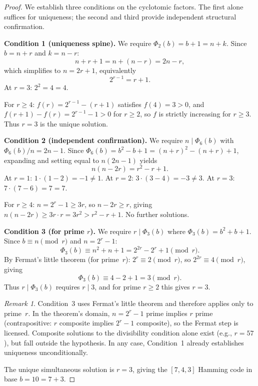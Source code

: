 \documentclass[11pt]{article}
\theoremstyle{definition}
\theoremstyle{remark}
\newtheorem{remark}{Remark}
\begin{document}
\begin{proof}
We establish three conditions on the cyclotomic factors. The first
alone suffices for uniqueness; the second and third provide
independent structural confirmation.

\medskip
\noindent\textbf{Condition 1 (uniqueness spine).}
We require $\Phi_2(b) = b+1 = n+k$. Since $b=n+r$ and $k=n-r$:
\[
n+r+1 = n + (n-r) = 2n-r,
\]
which simplifies to $n = 2r+1$, equivalently
\begin{equation}\label{eq:cond1}
2^{r-1} = r+1.
\end{equation}
At $r=3$: $2^2 = 4 = 4$. \checkmark

For $r \geq 4$: $f(r) = 2^{r-1}-(r+1)$ satisfies $f(4)=3>0$, and
$f(r+1)-f(r) = 2^{r-1}-1 > 0$ for $r \geq 2$, so $f$ is strictly
increasing for $r \geq 3$. Thus $r=3$ is the unique solution.

\medskip
\noindent\textbf{Condition 2 (independent confirmation).}
We require $n \mid \Phi_6(b)$ with $\Phi_6(b)/n = 2n-1$.
Since $\Phi_6(b) = b^2-b+1 = (n+r)^2-(n+r)+1$, expanding and
setting equal to $n(2n-1)$ yields
\begin{equation}\label{eq:cond2}
n(n-2r) = r^2-r+1.
\end{equation}
At $r=1$: $1 \cdot (1-2) = -1 \neq 1$. At $r=2$: $3 \cdot (3-4) = -3 \neq 3$.
At $r=3$: $7 \cdot (7-6) = 7 = 7$. \checkmark

For $r \geq 4$: $n = 2^r-1 \geq 3r$, so $n-2r \geq r$, giving
$n(n-2r) \geq 3r \cdot r = 3r^2 > r^2-r+1$. No further solutions.

\medskip
\noindent\textbf{Condition 3 (for prime $r$).}
We require $r \mid \Phi_3(b)$ where $\Phi_3(b) = b^2+b+1$.
Since $b \equiv n \pmod{r}$ and $n = 2^r-1$:
\[
\Phi_3(b) \equiv n^2+n+1 = 2^{2r}-2^r+1 \pmod{r}.
\]
By Fermat's little theorem (for prime~$r$): $2^r \equiv 2 \pmod{r}$,
so $2^{2r} \equiv 4 \pmod{r}$, giving
\[
\Phi_3(b) \equiv 4-2+1 = 3 \pmod{r}.
\]
Thus $r \mid \Phi_3(b)$ requires $r \mid 3$, and for prime $r \geq 2$
this gives $r=3$.

\begin{remark}
Condition~3 uses Fermat's little theorem and therefore applies only
to prime~$r$. In the theorem's domain, $n=2^r-1$ prime implies $r$
prime (contrapositive: $r$ composite implies $2^r-1$ composite), so
the Fermat step is licensed. Composite solutions to the divisibility
condition alone exist (e.g., $r=57$), but fall outside the hypothesis.
In any case, Condition~1 already establishes uniqueness unconditionally.
\end{remark}

The unique simultaneous solution is $r=3$, giving the $[7,4,3]$
Hamming code in base $b=10=7+3$.
\end{proof}
\end{document}
